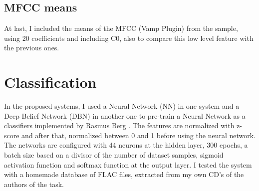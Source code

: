 \documentclass{article}
\begin{document}
\subsection{MFCC means}\label{subsec:mfcc_means}
At last, I included the means of the MFCC (Vamp Plugin) from the sample, using 20 coefficients and including C0, also to compare this low level feature with the previous ones.


\section{Classification}\label{sec:classification}

In the proposed systems, I used a Neural Network (NN) in one system and a Deep Belief Network (DBN) in another one to pre-train a Neural Network as a classifiers implemented by Rasmus Berg \cite{rasmusen}. The features are normalized with z-score and after that, normalized between 0 and 1 before using the neural network. The networks are configured with 44 neurons at the hidden layer, 300 epochs, a batch size based on a divisor of the number of dataset samples, sigmoid activation function and softmax function at the output layer. I tested the system with a homemade database of FLAC files, extracted from my own CD's of the authors of the task.
\end{document}
